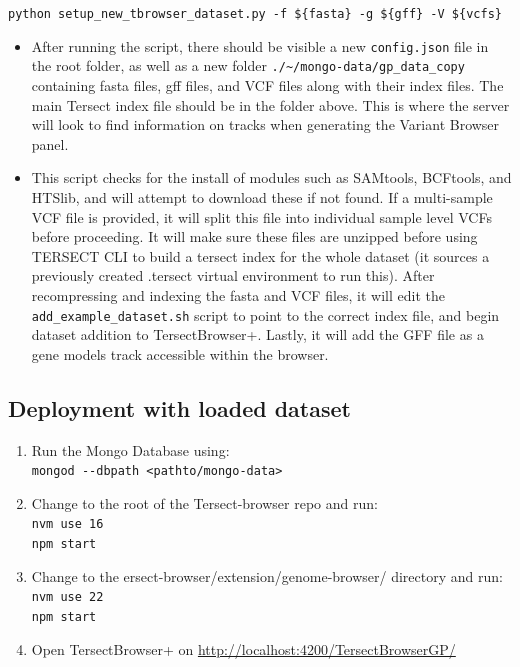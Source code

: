 \documentclass[12pt]{article}
\begin{document}
\begin{enumerate}
        \verb+python setup_new_tbrowser_dataset.py -f ${fasta} -g ${gff} -V ${vcfs}+
        \begin{itemize}
            \item After running the script, there should be visible a new \verb+config.json+ file in the root folder, as well as a new folder \verb+./~/mongo-data/gp_data_copy+ containing fasta files, gff files, and VCF files along with their index files. The main Tersect index file should be in the folder above. This is where the server will look to find information on tracks when generating the Variant Browser panel.
            \item This script checks for the install of modules such as SAMtools, BCFtools, and HTSlib, and will attempt to download these if not found. If a multi-sample VCF file is provided, it will split this file into individual sample level VCFs before proceeding. It will make sure these files are unzipped before using TERSECT CLI to build a tersect index for the whole dataset (it sources a previously created .tersect virtual environment to run this). After recompressing and indexing the fasta and VCF files, it will edit the \verb+add_example_dataset.sh+ script to point to the correct index file, and begin dataset addition to TersectBrowser+. Lastly, it will add the GFF file as a gene models track accessible within the browser.
        \end{itemize}
\end{enumerate}

\subsection{Deployment with loaded dataset}
\begin{enumerate}
    \item Run the Mongo Database using: \\
        \verb+mongod --dbpath <pathto/mongo-data>+
    \item Change to the root of the Tersect-browser repo and run:\\
        \verb+nvm use 16+\\
        \verb+npm start+
    \item Change to the ersect-browser/extension/genome-browser/ directory and run:\\
        \verb+nvm use 22+\\
        \verb+npm start+
    \item Open TersectBrowser+ on \url{http://localhost:4200/TersectBrowserGP/}
\end{enumerate}
\end{document}
